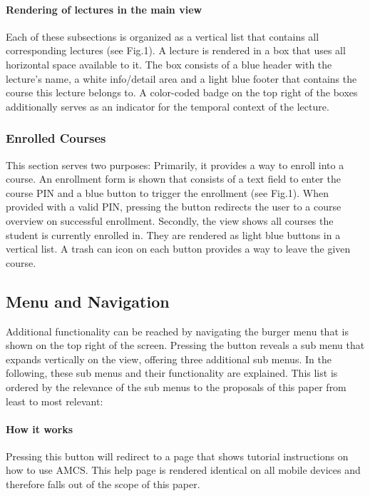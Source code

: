 \documentclass{sigplanconf}
\begin{document}
\newline

\paragraph{Rendering of lectures in the main view}

Each of these subsections is organized as a vertical list that contains all corresponding lectures (see Fig.1). A lecture is rendered in a box that uses all horizontal space available to it. The box consists of a blue header with the lecture's name, a white info/detail area and a light blue footer that contains the course this lecture belongs to.
A color-coded badge on the top right of the boxes additionally serves as an indicator for the temporal context of the lecture.

\subsubsection{Enrolled Courses}

This section serves two purposes: Primarily, it provides a way to enroll into a course. An enrollment form is shown that consists of a text field to enter the course PIN and a blue button to trigger the enrollment (see Fig.1). When provided with a valid PIN, pressing the button redirects the user to a course overview on successful enrollment.
Secondly, the view shows all courses the student is currently enrolled in. They are rendered as light blue buttons in a vertical list. A trash can icon on each button provides a way to leave the given course.


\subsection{Menu and Navigation}
Additional functionality can be reached by navigating the burger menu that is shown on the top right of the screen. Pressing the button reveals a sub menu that expands vertically on the view, offering three additional sub menus. In the following, these sub menus and their functionality are explained. This list is ordered by the relevance of the sub menus to the proposals of this paper from least to most relevant:

\paragraph{How it works}

Pressing this button will redirect to a page that shows tutorial instructions on how to use AMCS.
This help page is rendered identical on all mobile devices and therefore falls out of the scope of this paper.
\end{document}

